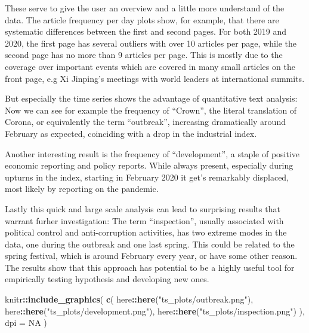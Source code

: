 \documentclass[12pt,a4paper]{article}
\newenvironment{Shaded}{\begin{snugshade}}{\end{snugshade}}
\newcommand{\DataTypeTok}[1]{\textcolor[rgb]{0.13,0.29,0.53}{#1}}
\newcommand{\KeywordTok}[1]{\textcolor[rgb]{0.13,0.29,0.53}{\textbf{#1}}}
\newcommand{\NormalTok}[1]{#1}
\newcommand{\OperatorTok}[1]{\textcolor[rgb]{0.81,0.36,0.00}{\textbf{#1}}}
\newcommand{\OtherTok}[1]{\textcolor[rgb]{0.56,0.35,0.01}{#1}}
\newcommand{\StringTok}[1]{\textcolor[rgb]{0.31,0.60,0.02}{#1}}
\begin{document}
These serve to give the user an overview and a little more understand of
the data. The article frequency per day plots show, for example, that
there are systematic differences between the first and second pages. For
both 2019 and 2020, the first page has several outliers with over 10
articles per page, while the second page has no more than 9 articles per
page. This is mostly due to the coverage over important events which are
covered in many small articles on the front page, e.g Xi Jinping's
meetings with world leaders at international summits.

But especially the time series shows the advantage of quantitative text
analysis: Now we can see for example the frequency of \enquote{Crown},
the literal translation of Corona, or equivalently the term
\enquote{outbreak}, increasing dramatically around February as expected,
coinciding with a drop in the industrial index.

Another interesting result is the frequency of \enquote{development}, a
staple of positive economic reporting and policy reports. While always
present, especially during upturns in the index, starting in February
2020 it get's remarkably displaced, most likely by reporting on the
pandemic.

Lastly this quick and large scale analysis can lead to surprising
results that warrant furher investigation: The term
\enquote{inspection}, usually associated with political control and
anti-corruption activities, has two extreme modes in the data, one
during the outbreak and one last spring. This could be related to the
spring festival, which is around February every year, or have some other
reason. The results show that this approach has potential to be a highly
useful tool for empirically testing hypothesis and developing new ones.

\begin{Shaded}
\begin{Highlighting}[]
\NormalTok{knitr}\OperatorTok{::}\KeywordTok{include_graphics}\NormalTok{(}
  \KeywordTok{c}\NormalTok{(}
\NormalTok{    here}\OperatorTok{::}\KeywordTok{here}\NormalTok{(}\StringTok{"ts_plots/outbreak.png"}\NormalTok{),}
\NormalTok{    here}\OperatorTok{::}\KeywordTok{here}\NormalTok{(}\StringTok{"ts_plots/development.png"}\NormalTok{),}
\NormalTok{    here}\OperatorTok{::}\KeywordTok{here}\NormalTok{(}\StringTok{"ts_plots/inspection.png"}\NormalTok{)}
\NormalTok{  ),}
  \DataTypeTok{dpi =} \OtherTok{NA}
\NormalTok{)}
\end{Highlighting}
\end{Shaded}
\end{document}
